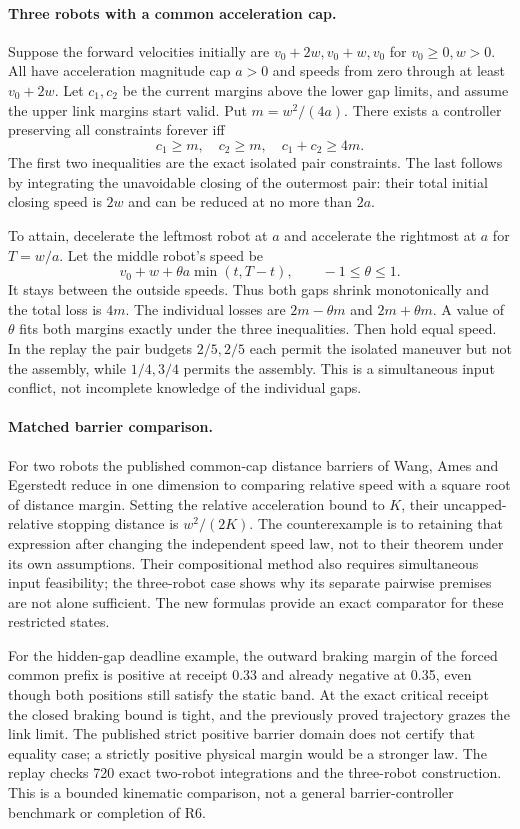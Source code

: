 \documentclass[11pt]{article}
\begin{document}
\paragraph{Three robots with a common acceleration cap.}
Suppose the forward velocities initially are \(v_0+2w,v_0+w,v_0\)
for \(v_0\ge0,w>0\). All have acceleration magnitude cap \(a>0\)
and speeds from zero through at least \(v_0+2w\).
Let \(c_1,c_2\) be the current margins above the lower gap limits,
and assume the upper link margins start valid. Put \(m=w^2/(4a)\).
There exists a controller preserving all constraints forever iff
\[
             c_1\ge m,\quad c_2\ge m,\quad c_1+c_2\ge4m.
\]
The first two inequalities are the exact isolated pair constraints.
The last follows by integrating the unavoidable closing of the
outermost pair: their total initial closing speed is \(2w\)
and can be reduced at no more than \(2a\).

To attain, decelerate the leftmost robot at \(a\) and accelerate the
rightmost at \(a\) for \(T=w/a\). Let the middle robot's speed be
\[
        v_0+w+\theta a\min(t,T-t),\qquad -1\le\theta\le1 .
\]
It stays between the outside speeds. Thus both gaps shrink
monotonically and the total loss is \(4m\). The individual losses
are \(2m-\theta m\) and \(2m+\theta m\). A value of \(\theta\) fits
both margins exactly under the three inequalities. Then hold equal
speed. In the replay the pair budgets \(2/5,2/5\) each permit the
isolated maneuver but not the assembly, while \(1/4,3/4\) permits
the assembly. This is a simultaneous input conflict, not incomplete
knowledge of the individual gaps.

\paragraph{Matched barrier comparison.}
For two robots the published common-cap distance barriers of
Wang, Ames and Egerstedt reduce in one dimension to comparing
relative speed with a square root of distance margin.
Setting the relative acceleration bound to \(K\), their
uncapped-relative stopping distance is \(w^2/(2K)\).
The counterexample is to retaining that expression after changing
the independent speed law, not to their theorem under its own
assumptions. Their compositional method also requires simultaneous
input feasibility; the three-robot case shows why its separate
pairwise premises are not alone sufficient. The new formulas
provide an exact comparator for these restricted states.

For the hidden-gap deadline example, the outward braking margin
of the forced common prefix is positive at receipt 0.33 and
already negative at 0.35, even though both positions still
satisfy the static band. At the exact critical receipt the closed
braking bound is tight, and the previously proved trajectory
grazes the link limit. The published strict positive barrier domain
does not certify that equality case; a strictly positive physical
margin would be a stronger law. The replay checks 720 exact
two-robot integrations and the three-robot construction.
This is a bounded kinematic comparison, not a general
barrier-controller benchmark or completion of R6.
\end{document}
